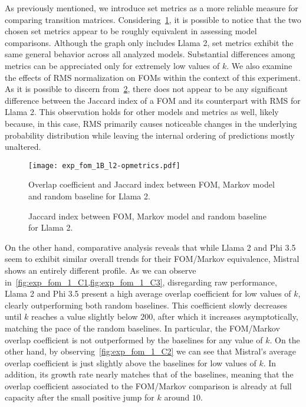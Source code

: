 As previously mentioned, we introduce set metrics as a more reliable measure for comparing transition matrices.
Considering~\cref{fig:exp_fom_1_B1}, it is possible to notice that the two chosen set metrics appear to be roughly equivalent in assessing model comparisons.
Although the graph only includes Llama 2, set metrics exhibit the same general behavior across all analyzed models.
Substantial differences among metrics can be appreciated only for extremely low values of $k$.
We also examine the effects of RMS normalization on FOMs within the context of this experiment.
As it is possible to discern from~\cref{fig:exp_fom_1_B}, there does not appear to be any significant difference between the Jaccard index of a FOM and its counterpart with RMS for Llama 2.
This observation holds for other models and metrics as well, likely because, in this case, RMS primarily causes noticeable changes in the underlying probability distribution while leaving the internal ordering of predictions mostly unaltered.

\begin{figure}[t!]
    \centering
    \texttt{[image: exp\_fom\_1B\_l2-opmetrics.pdf]}
    \caption[Overlap coefficient and Jaccard index for Llama 2.]{Overlap coefficient and Jaccard index between FOM, Markov model and random baseline for Llama 2.}
    \label{fig:exp_fom_1_B1}
\end{figure}
\begin{figure}[t!]
    \caption[Jaccard index for Llama 2 considering FOM and FOM with RMS.]{Jaccard index between FOM, Markov model and random baseline for Llama 2.}
    \label{fig:exp_fom_1_B}
\end{figure}

On the other hand, comparative analysis reveals that while Llama 2 and Phi 3.5 seem to exhibit similar overall trends for their FOM/Markov equivalence, Mistral shows an entirely different profile.
As we can observe in~\cref{fig:exp_fom_1_C1,fig:exp_fom_1_C3}, disregarding raw performance, Llama 2 and Phi 3.5 present a high average overlap coefficient for low values of $k$, clearly outperforming both random baselines.
This coefficient slowly decreases until $k$ reaches a value slightly below $200$, after which it increases asymptotically, matching the pace of the random baselines.
In particular, the FOM/Markov overlap coefficient is not outperformed by the baselines for any value of $k$.
On the other hand, by observing~\cref{fig:exp_fom_1_C2} we can see that Mistral's average overlap coefficient is just slightly above the baselines for low values of $k$.
In addition, its growth rate nearly matches that of the baselines, meaning that the overlap coefficient associated to the FOM/Markov comparison is already at full capacity after the small positive jump for $k$ around $10$.

